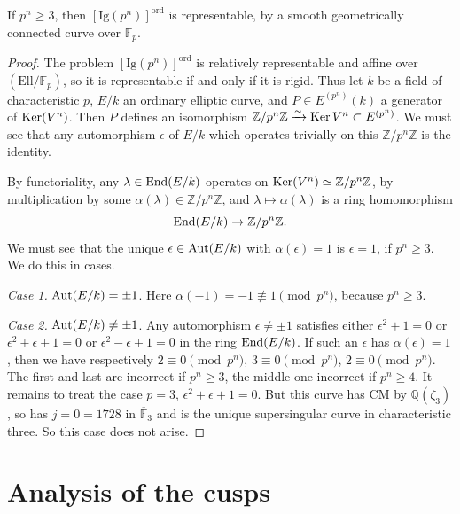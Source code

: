 \begin{kcor}\label{cor:12.6.3}
If $p^n \ge 3$, then $[\mathrm{Ig}(p^n)]^{\mathrm{ord}}$ is representable, by a smooth geometrically connected curve over $\mathbb{F}_p$.
\end{kcor}

\begin{proof}
The problem $[\mathrm{Ig}(p^n)]^{\mathrm{ord}}$ is relatively representable and affine over $(\mathrm{Ell}/\mathbb{F}_p)$, so it is representable if and only if it is rigid. Thus let $k$ be a field of characteristic $p$, $E/k$ an ordinary elliptic curve, and $P \in E^{(p^n)}(k)$ a generator of $\operatorname{Ker}(V^n)$. Then $P$ defines an isomorphism $\mathbb{Z}/p^n\mathbb{Z} \xrightarrow{\sim} \operatorname{Ker} V^n \subset E^{(p^n)}$. We must see that any automorphism $\epsilon$ of $E/k$ which operates trivially on this $\mathbb{Z}/p^n\mathbb{Z}$ is the identity.

By functoriality, any $\lambda \in \operatorname{End}(E/k)$ operates on $\operatorname{Ker}(V^n) \simeq \mathbb{Z}/p^n\mathbb{Z}$, by multiplication by some $\alpha(\lambda) \in \mathbb{Z}/p^n\mathbb{Z}$, and $\lambda \mapsto \alpha(\lambda)$ is a ring homomorphism
\[
\operatorname{End}(E/k) \to \mathbb{Z}/p^n\mathbb{Z} .
\]
We must see that the unique $\epsilon \in \operatorname{Aut}(E/k)$ with $\alpha(\epsilon) = 1$ is $\epsilon = 1$, if $p^n \ge 3$. We do this in cases.

\emph{Case 1.} $\operatorname{Aut}(E/k) = \pm 1$. Here $\alpha(-1) = -1 \not\equiv 1 \pmod{p^n}$, because $p^n \ge 3$.

\emph{Case 2.} $\operatorname{Aut}(E/k) \neq \pm 1$. Any automorphism $\epsilon \neq \pm 1$ satisfies either $\epsilon^2 + 1 = 0$ or $\epsilon^2 + \epsilon + 1 = 0$ or $\epsilon^2 - \epsilon + 1 = 0$ in the ring $\operatorname{End}(E/k)$. If such an $\epsilon$ has $\alpha(\epsilon) = 1$, then we have respectively $2 \equiv 0 \pmod{p^n}$, $3 \equiv 0 \pmod{p^n}$, $2 \equiv 0 \pmod{p^n}$. The first and last are incorrect if $p^n \ge 3$, the middle one incorrect if $p^n \ge 4$. It remains to treat the case $p = 3$, $\epsilon^2 + \epsilon + 1 = 0$. But this curve has CM by $\mathbb{Q}(\zeta_3)$, so has $j = 0 = 1728$ in $\overline{\mathbb{F}}_3$ and is the unique supersingular curve in characteristic three. So this case does not arise.
\end{proof}

\section{Analysis of the cusps}
\label{sec:12.7}

